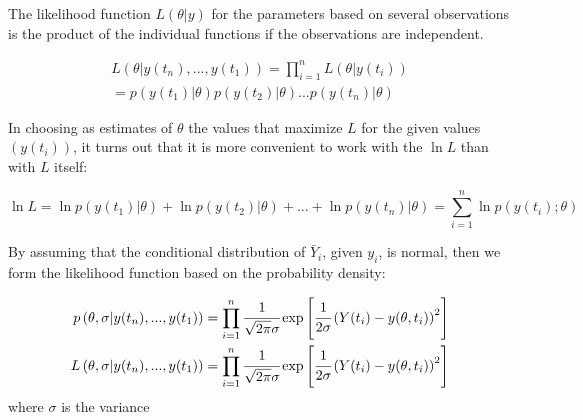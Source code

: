 \documentclass[../Article_Model_Parameters.tex]{subfiles}
\begin{document}
%
		The likelihood function $L\left( \theta | y \right)$ for the parameters based on several observations is the product of the individual functions if the observations are independent.
		
		{\footnotesize 
			\begin{multline}
				L\left( \theta|y(t_n),...,y(t_1) \right) = \prod_{i=1}^{n} L\left( \theta|y(t_i) \right) \\
				= p\left( y(t_1)| \theta \right)p\left( y(t_2)| \theta \right) ... p\left( y(t_n)| \theta \right)
		\end{multline} }
		
		In choosing as estimates of $\theta$ the values that maximize $L$ for the given values $\left( y(t_i) \right)$, it turns out that it is more convenient to work with the $\ln L$ than with $L$ itself:
		
		{\footnotesize 
			\begin{equation}
				\ln L = \ln p \left( y(t_1)| \theta \right) + \ln p\left( y(t_2)| \theta \right) + ... + \ln p \left( y(t_n)| \theta \right) = \sum_{i=1}^{n} \ln p\left( y(t_i); \theta \right)
		\end{equation} }
		
		By assuming that the conditional distribution of $\bar{Y}_i$, given $y_i$, is normal, then we form the likelihood function based on the probability density:
		
		{\footnotesize
			\begin{align} \label{EQ: MLE_Norm}
				p\left(  \theta, \sigma | y(t_n),...,y(t_1) \right) &= \prod_{i=1}^{n} \cfrac{1}{\sqrt{2 \pi} \sigma } \exp \left[ \cfrac{1}{2  \sigma } \left( Y(t_i) - y(\theta , t_i) \right)^2 \right] \nonumber \\
				L\left( \theta, \sigma | y(t_n),...,y(t_1) \right) &= \prod_{i=1}^{n} \cfrac{1}{\sqrt{2 \pi} \sigma } \exp \left[ \cfrac{1}{2  \sigma } \left( Y(t_i) - y(\theta , t_i) \right)^2 \right]
		\end{align}}
		where $\sigma$ is the variance
		
\end{document}
